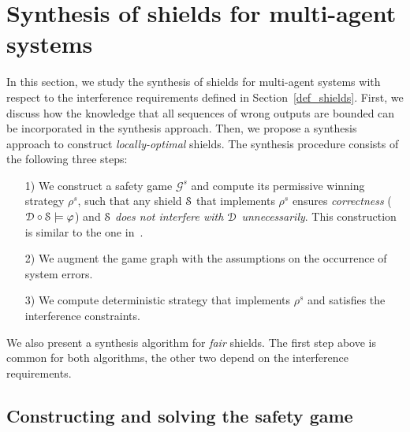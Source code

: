 \section{Synthesis of shields for multi-agent systems}
\label{sec_synth}

In this section, we study the synthesis of
shields for multi-agent systems with respect to the interference requirements defined in Section~\ref{def_shields}.
First, we discuss how the knowledge that all sequences of wrong outputs are bounded can be incorporated
in the synthesis approach. 
%
Then, we propose a synthesis approach to construct \emph{locally-optimal} shields. 
The synthesis procedure consists of the following three steps:
\begin{itemize}
  \item[1)] We construct a safety game $\mathcal G^s$ and compute its permissive winning strategy $\rho^s$, such that any shield $\mathcal{S}$ that implements $\rho^s$ ensures \emph{correctness} ($\mathcal{D} \circ \mathcal{S} \models \varphi$) and $\mathcal{S}$
      \emph{does not interfere with $\mathcal{D}$ unnecessarily}. This construction is similar to the one  in~\cite{KonighoferABHKT17}.
  \item[2)] We augment the game graph with the assumptions on the occurrence of system errors.
  \item[3)] We compute deterministic strategy that implements $\rho^s$ and 
  satisfies the  interference constraints.
\end{itemize}
\iffalse MEAN-PAYOFF
The synthesis algorithms for \emph{$c_{\mathsf{mp}}$-optimal} shields and  \emph{fair} shields are presented in Appendix~\ref{appx:synthesis-mp} and Appendix~\ref{appx:synthesis-fair}. The first step is common for all algorithms, and the other two depend on the interference requirements.
\fi
We also present a synthesis algorithm for \emph{fair} shields. The first step above is common for both algorithms, the other two depend on the interference requirements.

\subsection{Constructing and solving the safety game}

